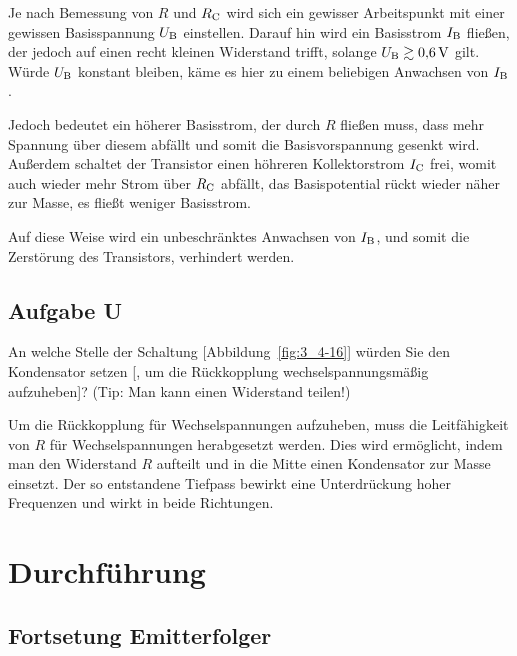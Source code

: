 Je nach Bemessung von $R$ und $R_\text{C}$ wird sich ein gewisser Arbeitspunkt mit
einer gewissen Basisspannung $U_\text{B}$ einstellen. Darauf hin wird ein Basisstrom
$I_\text{B}$ fließen, der jedoch auf einen recht kleinen Widerstand trifft, solange
$U_\text{B} \gtrsim \SI{.6}\volt$ gilt. Würde $U_\text{B}$ konstant bleiben, käme es hier zu
einem beliebigen Anwachsen von $I_\text{B}$.

Jedoch bedeutet ein höherer Basisstrom, der durch $R$ fließen muss, dass mehr
Spannung über diesem abfällt und somit die Basisvorspannung gesenkt wird.
Außerdem schaltet der Transistor einen höhreren Kollektorstrom $I_\text{C}$ frei,
womit auch wieder mehr Strom über $R_\text{C}$ abfällt, das Basispotential rückt
wieder näher zur Masse, es fließt weniger Basisstrom.

Auf diese Weise wird ein unbeschränktes Anwachsen von $I_\text{B}$, und somit die
Zerstörung des Transistors, verhindert werden.

\FloatBarrier
\subsection{Aufgabe U}

\begin{problem}
    An welche Stelle der Schaltung [Abbildung~\ref{fig:3_4-16}] würden Sie den
    Kondensator setzen [, um die Rückkopplung wechselspannungsmäßig
    aufzuheben]? (Tip: Man kann einen Widerstand teilen!)
\end{problem}

Um die Rückkopplung für Wechselspannungen aufzuheben, muss die Leitfähigkeit
von $R$ für Wechselspannungen herabgesetzt werden. Dies wird ermöglicht, indem
man den Widerstand $R$ aufteilt und in die Mitte einen Kondensator zur Masse
einsetzt. Der so entstandene Tiefpass bewirkt eine Unterdrückung hoher
Frequenzen und wirkt in beide Richtungen.


\FloatBarrier
\section{Durchführung}

\FloatBarrier
\subsection{Fortsetung Emitterfolger}

